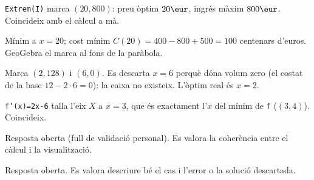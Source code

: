 \begin{solucions}
\begin{sollist}
  \item \texttt{Extrem(I)} marca $(20,800)$: preu òptim $20\eur$, ingrés màxim $800\eur$.
        Coincideix amb el càlcul a mà.
  \item Mínim a $x=20$; cost mínim $C(20)=400-800+500=100$ centenars d'euros. GeoGebra el
        marca al fons de la paràbola.
  \item Marca $(2,128)$ i $(6,0)$. Es descarta $x=6$ perquè dóna volum zero (el costat de
        la base $12-2\cdot 6=0$): la caixa no existeix. L'òptim real és $x=2$.
  \item \texttt{f'(x)=2x-6} talla l'eix $X$ a $x=3$, que és exactament l'$x$ del mínim de
        \texttt{f} ($(3,4)$). Coincideix.
  \item Resposta oberta (full de validació personal). Es valora la coherència entre el
        càlcul i la visualització.
  \item Resposta oberta. Es valora descriure bé el cas i l'error o la solució descartada.
\end{sollist}
\end{solucions}
